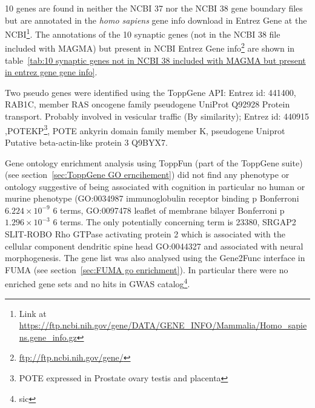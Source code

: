 10 genes are found in neither the NCBI 37 nor the NCBI 38 gene boundary files but are annotated in the\textit{ homo sapiens} gene info download in Entrez Gene at the NCBI\footnote{Link at \url{https://ftp.ncbi.nih.gov/gene/DATA/GENE_INFO/Mammalia/Homo_sapiens.gene_info.gz} }. The annotations of the 10 synaptic genes (not in the NCBI 38 file included with MAGMA) but present in NCBI Entrez Gene info\footnote{\url{ftp://ftp.ncbi.nih.gov/gene/}} are shown in table~\ref{tab:10 synaptic genes not in NCBI 38 included with MAGMA but present in entrez gene gene info}.

Two pseudo genes were identified using the ToppGene API\cite{chen2009toppgene}: Entrez id:	441400, RAB1C, member RAS oncogene family pseudogene UniProt Q92928 Protein transport. Probably involved in vesicular traffic (By similarity); Entrez id:	440915	,POTEKP\footnote{POTE expressed in Prostate ovary testis and placenta}, POTE ankyrin domain family member K, pseudogene \cite{bera2002pote} Uniprot Putative beta-actin-like protein 3 Q9BYX7. 


Gene ontology enrichment analysis using ToppFun (part of the ToppGene suite) (see section~\ref{sec:ToppGene GO erncihement}) did not find any phenotype or ontology suggestive of being associated with cognition in particular no human or murine phenotype (GO:0034987	immunoglobulin receptor binding 	p Bonferroni $6.224\times10^{-9}$	6 terms, 	GO:0097478	leaflet of membrane bilayer	Bonferroni p	$1.296\times10^{-3}$	6	terms. The only potentially concerning term is 23380,	SRGAP2	SLIT-ROBO Rho GTPase activating protein 2 which is associated with the cellular component dendritic spine head GO:0044327 and associated with neural morphogenesis\cite{guerrier2009f}. The gene list was also analysed using the Gene2Func interface in FUMA \cite{watanabe2017functional} (see section~\ref{sec:FUMA go enrichment}). In particular there were no enriched gene sets and no hits in GWAS catalog\footnote{sic}\cite{welter2014nhgri}.

